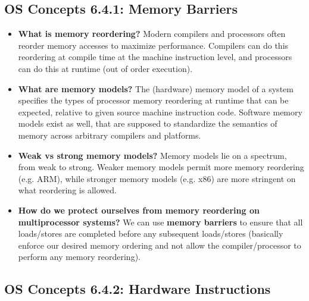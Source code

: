 \documentclass[12pt]{article}
\begin{document}
\subsection*{OS Concepts 6.4.1: Memory Barriers}

\begin{itemize}
    \item \textbf{What is memory reordering?} Modern compilers and processors often reorder memory accesses to maximize performance. Compilers can do this reordering at compile time at the machine instruction level, and processors can do this at runtime (out of order execution).
    \item \textbf{What are memory models?} The (hardware) memory model of a system specifies the types of processor memory reordering at runtime that can be expected, relative to given source machine instruction code. Software memory models exist as well, that are supposed to standardize the semantics of memory across arbitrary compilers and platforms.
    \item \textbf{Weak vs strong memory models?} Memory models lie on a spectrum, from weak to strong. Weaker memory models permit more memory reordering (e.g. ARM), while stronger memory models (e.g. x86) are more stringent on what reordering is allowed.
    \item \textbf{How do we protect ourselves from memory reordering on multiprocessor systems?} We can use \textbf{memory barriers} to ensure that all loads/stores are completed before any subsequent loads/stores (basically enforce our desired memory ordering and not allow the compiler/processor to perform any memory reordering).
\end{itemize}

\subsection*{OS Concepts 6.4.2: Hardware Instructions}
\end{document}
